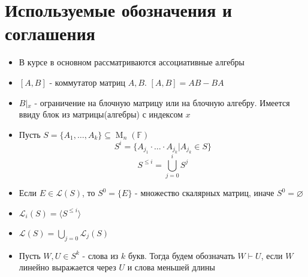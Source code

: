 \documentclass[a4paper, 14pt]{extarticle}
\theoremstyle{definition}
\begin{document}
\newpage
\section{Используемые обозначения и соглашения}

\begin{itemize}
	\item В курсе в основном рассматриваются ассоциативные алгебры
	\item \([A, B]\) - коммутатор матриц \(A, B\). \([A, B] = AB - BA\)
	\item \(B \left|_{x} \right.\) - ограничение на блочную матрицу или на блочную алгебру. Имеется ввиду блок из матрицы(алгебры) с индексом \(x\)
	\item Пусть \(S = \{A_1, \dots, A_k\} \subseteq \operatorname{M}_n(\mathbb{F})\)
	\[S^i = \{A_{j_1} \cdot \dots \cdot A_{j_k} | A_{j_k} \in S\}\]
	\[S^{\leqslant i} = \bigcup\limits_{j = 0}^i S^{j}\]
	\item Если \(E \in \mathcal{L}(S)\), то \(S^0 = \{E\}\) - множество скалярных матриц, иначе \(S^0 = \varnothing\)
	\item \(\mathcal{L}_i(S) = \langle S^{\leqslant i} \rangle\)
	\item \(\mathcal{L}(S) = \bigcup\limits_{j = 0} \mathcal{L}_j(S)\)
	\item Пусть \(W, U \in S^k\) - слова из \(k\) букв. Тогда будем обозначать \(W \vdash U\), если \(W\) линейно выражается через \(U\) и слова меньшей длины
\end{itemize}
\end{document}
